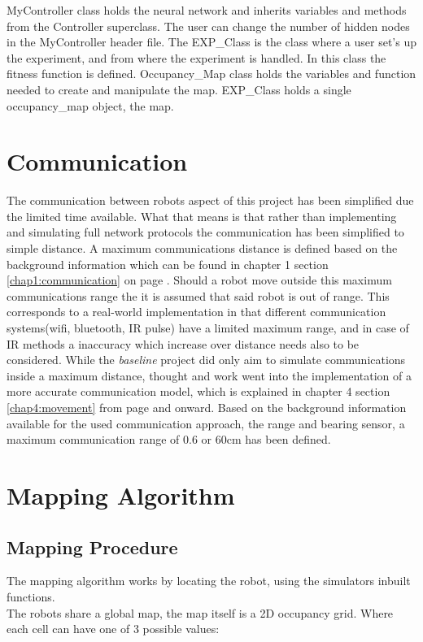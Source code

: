 MyController class holds the neural network and inherits variables and methods from the Controller superclass.
The user can change the number of hidden nodes in the MyController header file. 
The EXP\_Class is the class where a user set's up the experiment, and from where the experiment is handled. In this class the fitness function is defined.
Occupancy\_Map class holds the variables and function needed to create and manipulate the map.
EXP\_Class holds a single occupancy\_map object, the map.

\section{Communication}
The communication between robots aspect of this project has been simplified due the limited time available. 
What that means is that rather than implementing and simulating full network protocols the communication has been simplified to simple distance. A maximum communications distance is defined based on the background information which can be found in chapter 1 section \ref{chap1:communication} on page \pageref{chap1:communication}. 
Should a robot move outside this maximum communications range the it is assumed that said robot is out of range. This corresponds to a real-world implementation in that different communication systems(wifi, bluetooth, IR pulse) have a limited maximum range, and in case of IR methods a inaccuracy which increase over distance needs also to be considered.
While the \textit{baseline} project did only aim to simulate communications inside a maximum distance, thought and work went into the implementation of a more accurate communication model, which is explained in chapter 4 section \ref{chap4:movement} from page \pageref{chap4:movement} and onward.
Based on the background information available for the used communication approach, the range and bearing sensor, a maximum communication range of 0.6 or 60cm has been defined.

\section{Mapping Algorithm}
\subsection{Mapping Procedure}
The mapping algorithm works by locating the robot, using the simulators inbuilt functions. \\
The robots share a global map, the map itself is a 2D occupancy grid. Where each cell can have one of 3 possible values:\\

